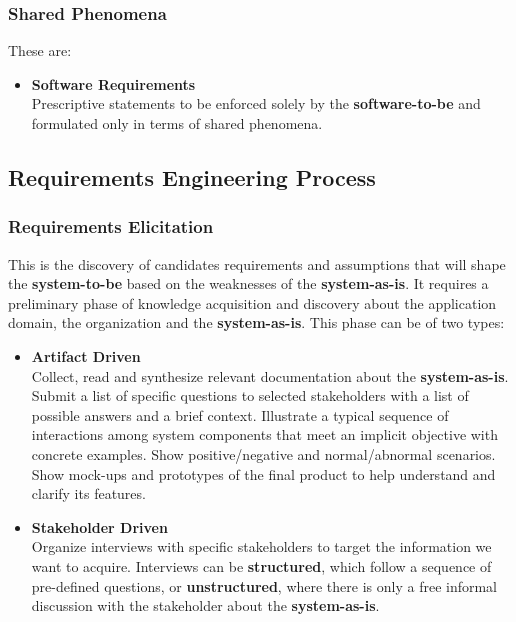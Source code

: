 \documentclass{article}
\begin{document}
\subsubsection{Shared Phenomena}
These are:

\begin{itemize}
	\item \textbf{Software Requirements}
	\vspace{.2cm} \\
	Prescriptive statements to be enforced solely by the \textbf{software-to-be} and formulated only in terms of shared phenomena.
\end{itemize}

\subsection{Requirements Engineering Process}
\subsubsection{Requirements Elicitation}
This is the discovery of candidates requirements and assumptions that will shape the \textbf{system-to-be} based on the weaknesses of the \textbf{system-as-is}. It requires a preliminary phase of knowledge acquisition and discovery about the application domain, the organization and the \textbf{system-as-is}. This phase can be of two types:

\begin{itemize}
	\item \textbf{Artifact Driven}
	\vspace{.2cm} \\
	Collect, read and synthesize relevant documentation about the \textbf{system-as-is}. Submit a list of specific questions to selected stakeholders with a list of possible answers and a brief context. Illustrate a typical sequence of interactions among system components that meet an implicit objective with concrete examples. Show positive/negative and normal/abnormal scenarios. Show mock-ups and prototypes of the final product to help understand and clarify its features.
	
	\item \textbf{Stakeholder Driven}
	\vspace{.2cm} \\
	Organize interviews with specific stakeholders to target the information we want to acquire. Interviews can be \textbf{structured}, which follow a sequence of pre-defined questions, or \textbf{unstructured}, where there is only a free informal discussion with the stakeholder about the \textbf{system-as-is}.
\end{itemize}
\end{document}
